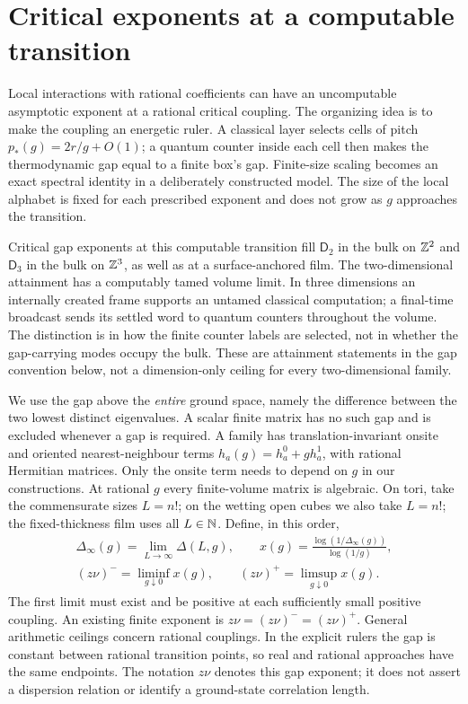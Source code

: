 \section{Critical exponents at a computable transition}\label{sec:intro}
Local interactions with rational coefficients can have an uncomputable
asymptotic exponent at a rational critical coupling. The organizing idea
is to make the coupling an energetic ruler. A classical layer selects
cells of pitch $p_*(g)=2r/g+O(1)$; a quantum counter inside each cell
then makes the thermodynamic gap equal to a finite box's gap. Finite-size
scaling becomes an exact spectral identity in a deliberately constructed
model. The size of the local alphabet is fixed for each prescribed
exponent and does not grow as $g$ approaches the transition.

Critical gap exponents at this computable transition fill $\mathsf D_2$
in the bulk on $\mathbb Z^2$ and $\mathsf D_3$ in the bulk on $\mathbb Z^3$,
as well as at a surface-anchored film. The two-dimensional attainment
has a computably tamed volume limit. In three dimensions an internally
created frame supports an untamed classical computation; a final-time
broadcast sends its settled word to quantum counters throughout the
volume. The distinction is in how the finite counter labels are selected,
not in whether the gap-carrying modes occupy the bulk. These are
attainment statements in the gap convention below, not a dimension-only
ceiling for every two-dimensional family.

We use the gap above the \emph{entire} ground space, namely the difference
between the two lowest distinct eigenvalues. A scalar finite matrix has
no such gap and is excluded whenever a gap is required. A family has
translation-invariant onsite and oriented nearest-neighbour terms
$h_a(g)=h_a^0+g h_a^1$, with rational Hermitian matrices. Only the onsite
term needs to depend on $g$ in our constructions. At rational $g$ every
finite-volume matrix is algebraic. On tori, take the commensurate sizes
$L=n!$; on the wetting open cubes we also take $L=n!$; the fixed-thickness film uses all $L\in\mathbb N$. Define, in this order,
\begin{equation}\label{eq:critical-definition}
 \begin{gathered}
 \Delta_\infty(g)=\lim_{L\to\infty}\Delta(L,g),\qquad
 x(g)=\frac{\log(1/\Delta_\infty(g))}{\log(1/g)},\\
 (z\nu)^-=\liminf_{g\downarrow0}x(g),\qquad
 (z\nu)^+=\limsup_{g\downarrow0}x(g).
 \end{gathered}
\end{equation}
The first limit must exist and be positive at each sufficiently small
positive coupling. An existing finite exponent is $z\nu=(z\nu)^-=(z\nu)^+$.
General arithmetic ceilings concern rational couplings. In the explicit
rulers the gap is constant between rational transition points, so real
and rational approaches have the same endpoints. The notation $z\nu$
denotes this gap exponent; it does not assert a dispersion relation or
identify a ground-state correlation length.


